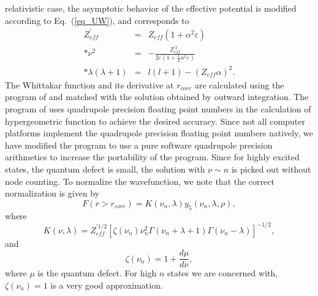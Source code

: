 \documentclass[preprint, floatfix, pra, showpacs, showkeys]{revtex4}
\begin{document}
relativistic case, the asymptotic behavior of the effective potential is
modified according to Eq.~(\ref{eq_UW}), and corresponds to 
\begin{eqnarray}
Z_{eff}^\prime &=& Z_{eff}(1+\alpha^2\varepsilon) \nonumber\\*
\nu^2 &=& -\frac{Z_{eff}^{\prime 2}}{2\varepsilon
\left(1+\frac{1}{2}\alpha^2\varepsilon\right)} \nonumber\\*
\lambda(\lambda+1) &=& l(l+1) - (Z_{eff}\alpha)^2 .
\end{eqnarray}
The Whittakar function and its derivative at $r_{core}$ are calculated
using the program of \textcite{thompson85} and matched with the solution
obtained by outward integration. The program of \textcite{thompson85} uses
quadrupole precision floating point numbers in the calculation of 
hypergeometric function to achieve the desired accuracy. Since not all computer
platforms implement the quadrupole precision floating point numbers natively,
we have modified the program to use a pure software quadrupole precision
arithmetics to increase the portability of the
program. Since for highly excited states, the quantum defect is 
small, the solution with $\nu \sim n$ is picked out without node counting. To
normalize the wavefunction, we note that the correct normalization is given by
\cite{seaton58}
\begin{equation}
\label{eq_norm}
F(r > r_{core}) = K(\nu_n, \lambda)y_5(\nu_n, \lambda, \rho),
\end{equation}
where 
\begin{equation}
K(\nu,\lambda) =
Z_{eff}^{\prime 1/2}\left[\zeta(\nu_n)\nu_n^2\Gamma(\nu_n+\lambda+1)
\Gamma(\nu_n-\lambda)\right]^{-1/2}, 
\end{equation}
and 
\begin{equation}
\zeta(\nu_n) = 1 + \frac{d\mu}{d\nu},
\end{equation}
where $\mu$ is the quantum defect. For high $n$ states we are concerned with,
$\zeta(\nu_n) = 1$ is a very good approximation.
\end{document}
